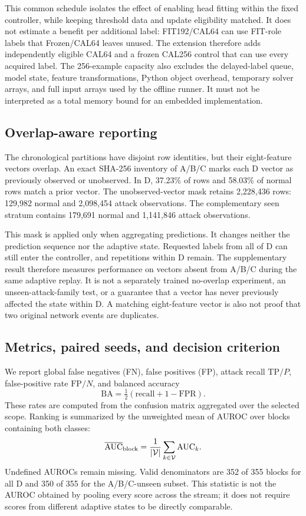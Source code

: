 This common schedule isolates the effect of enabling head fitting within the fixed controller, while keeping threshold data and update eligibility matched. It does not estimate a benefit per additional label: FIT192/CAL64 can use FIT-role labels that Frozen/CAL64 leaves unused. The extension therefore adds independently eligible CAL64 and a frozen CAL256 control that can use every acquired label. The 256-example capacity also excludes the delayed-label queue, model state, feature transformations, Python object overhead, temporary solver arrays, and full input arrays used by the offline runner. It must not be interpreted as a total memory bound for an embedded implementation.

\subsection{Overlap-aware reporting}\label{sec:overlap}
The chronological partitions have disjoint row identities, but their eight-feature vectors overlap. An exact SHA-256 inventory of A/B/C marks each D vector as previously observed or unobserved. In D, 37.23\% of rows and 58.03\% of normal rows match a prior vector. The unobserved-vector mask retains 2,228,436 rows: 129,982 normal and 2,098,454 attack observations. The complementary seen stratum contains 179,691 normal and 1,141,846 attack observations.

This mask is applied only when aggregating predictions. It changes neither the prediction sequence nor the adaptive state. Requested labels from all of D can still enter the controller, and repetitions within D remain. The supplementary result therefore measures performance on vectors absent from A/B/C during the same adaptive replay. It is not a separately trained no-overlap experiment, an unseen-attack-family test, or a guarantee that a vector has never previously affected the state within D. A matching eight-feature vector is also not proof that two original network events are duplicates.

\subsection{Metrics, paired seeds, and decision criterion}
We report global false negatives (FN), false positives (FP), attack recall $\mathrm{TP}/P$, false-positive rate $\mathrm{FP}/N$, and balanced accuracy
\begin{equation}
 \mathrm{BA}=\tfrac12\left(\mathrm{recall}+1-\mathrm{FPR}\right).
\end{equation}
These rates are computed from the confusion matrix aggregated over the selected scope. Ranking is summarized by the unweighted mean of AUROC over blocks containing both classes:
\begin{equation}
 \overline{\mathrm{AUC}}_{\mathrm{block}}=\frac{1}{|\mathcal{V}|}\sum_{k\in\mathcal{V}}\mathrm{AUC}_k.
\end{equation}
Undefined AUROCs remain missing. Valid denominators are 352 of 355 blocks for all D and 350 of 355 for the A/B/C-unseen subset. This statistic is not the AUROC obtained by pooling every score across the stream; it does not require scores from different adaptive states to be directly comparable.

